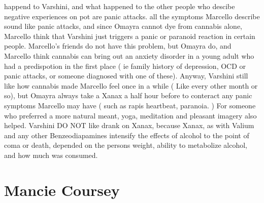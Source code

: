 \documentclass[12pt]{book}
\begin{document}
happend to Varshini, and what happened to the other people who descibe negative experiences on pot are panic attacks. all the symptoms Marcello describe sound like panic attacks, and since Omayra cannot dye from cannabis alone, Marcello think that Varshini just triggers a panic or paranoid reaction in certain people. Marcello's friends do not have this problem, but Omayra do, and Marcello think cannabis can bring out an anxiety disorder in a young adult who had a predispotion in the first place ( ie family history of depression, OCD or panic attacks, or someone diagnosed with one of these). Anyway, Varshini still like how cannabis made Marcello feel once in a while ( Like every other month or so), but Omayra always take a Xanax a half hour before to conteract any panic symptoms Marcello may have ( such as rapis heartbeat, paranoia. ) For someone who preferred a more natural meant, yoga, meditation and pleasant imagery also helped. Varshini DO NOT like drank on Xanax, because Xanax, as with Valium and any other Benzeodiapamines intensify the effects of alcohol to the point of coma or death, depended on the persons weight, ability to metabolize alcohol, and how much was consumed.



\chapter{Mancie Coursey}
\end{document}
